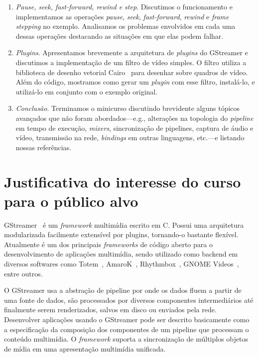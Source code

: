 \documentclass{SBCbookchapter}
\begin{document}
\begin{enumerate}
\item\emph{Pause, seek, fast-forward, rewind e step}.  Discutimos o
  funcionamento e implementamos as operações \emph{pause}, \emph{seek},
  \emph{fast-forward}, \emph{rewind} e \emph{frame stepping} no exemplo.
  Analisamos os problemas envolvidos em cada uma dessas operações destacando
  as situações em que elas podem falhar.

\item\emph{Plugins}.  Apresentamos brevemente a arquitetura de
  \emph{plugins} do GStreamer e discutimos a implementação de um filtro de
  vídeo simples.  O filtro utiliza a biblioteca de desenho vetorial
  Cairo~\cite{?} para desenhar sobre quadros de vídeo.  Além do código,
  mostramos como gerar um \emph{plugin} com esse filtro, instalá-lo, e
  utilizá-lo em conjunto com o exemplo original.

\item\emph{Conclusão}.  Terminamos o minicurso discutindo brevidente alguns
  tópicos avançados que não foram abordados---e.g., alterações na topologia
  do \emph{pipeline} em tempo de execução, \emph{mixers}, sincronização de
  pipelines, captura de áudio e vídeo, transmissão na rede, \emph{bindings}
  em outras linguagens, etc.---e listando nossas referências.
\end{enumerate}


\section{Justificativa do interesse do curso para o público alvo}

GStreamer~\cite{?} é um \emph{framework} multimídia escrito em C. Possui
uma arquitetura modularizada facilmente extensível por plugins, 
tornando-o bastante flexível. Atualmente é um dos principais \emph{frameworks} 
de código aberto para o desenvolvimento de aplicações multimídia, sendo
utilizado como backend em diversos softwares como Totem~\cite{?}, AmaroK~\cite{?},
Rhythmbox~\cite{?}, GNOME Videos~\cite{?}, entre outros.

O GStreamer usa a abstração de pipeline por onde os dados fluem 
a partir de uma fonte de dados, são processados por diversos componentes 
intermediários até finalmente serem renderizados, salvos em disco ou
enviados pela rede. Desenvolver aplicações usando o GStreamer pode ser
descrito basicamente como a especificação da composição dos componentes
de um pipeline que processam o conteúdo multimídia. O \emph{framework} 
suporta a sincronização de múltiplos objetos de mídia em uma apresentação
multimídia unificada.  
\end{document}
